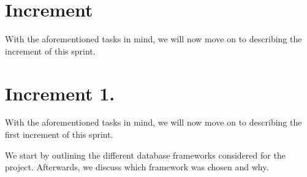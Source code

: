 \section{Increment}
With the aforementioned tasks in mind, we will now move on to describing the increment of this sprint.

\section{Increment 1.}
With the aforementioned tasks in mind, we will now move on to describing the first increment of this sprint.

We start by outlining the different database frameworks considered for the project.
Afterwards, we discuss which framework was chosen and why.







